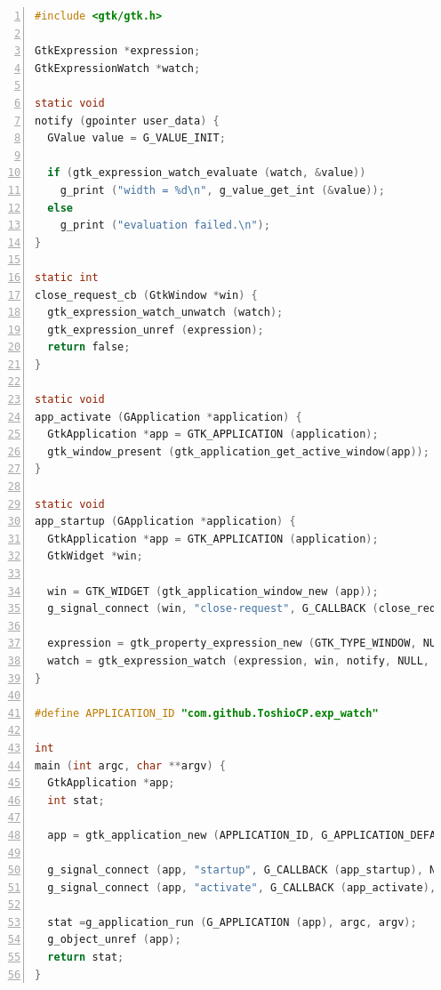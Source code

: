 \begin{lstlisting}[language=C, numbers=left]
#include <gtk/gtk.h>

GtkExpression *expression;
GtkExpressionWatch *watch;

static void
notify (gpointer user_data) {
  GValue value = G_VALUE_INIT;

  if (gtk_expression_watch_evaluate (watch, &value))
    g_print ("width = %d\n", g_value_get_int (&value));
  else
    g_print ("evaluation failed.\n");
}

static int
close_request_cb (GtkWindow *win) {
  gtk_expression_watch_unwatch (watch);
  gtk_expression_unref (expression);
  return false;
}

static void
app_activate (GApplication *application) {
  GtkApplication *app = GTK_APPLICATION (application);
  gtk_window_present (gtk_application_get_active_window(app));
}

static void
app_startup (GApplication *application) {
  GtkApplication *app = GTK_APPLICATION (application);
  GtkWidget *win;

  win = GTK_WIDGET (gtk_application_window_new (app));
  g_signal_connect (win, "close-request", G_CALLBACK (close_request_cb), NULL);

  expression = gtk_property_expression_new (GTK_TYPE_WINDOW, NULL, "default-width");
  watch = gtk_expression_watch (expression, win, notify, NULL, NULL);
}

#define APPLICATION_ID "com.github.ToshioCP.exp_watch"

int
main (int argc, char **argv) {
  GtkApplication *app;
  int stat;

  app = gtk_application_new (APPLICATION_ID, G_APPLICATION_DEFAULT_FLAGS);

  g_signal_connect (app, "startup", G_CALLBACK (app_startup), NULL);
  g_signal_connect (app, "activate", G_CALLBACK (app_activate), NULL);

  stat =g_application_run (G_APPLICATION (app), argc, argv);
  g_object_unref (app);
  return stat;
}
\end{lstlisting}

